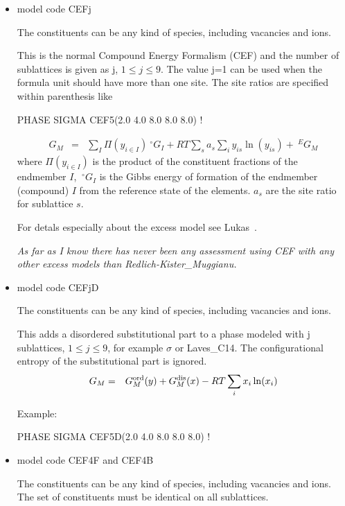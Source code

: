 \documentclass[12pt]{article}
\begin{document}
\begin{itemize}
\item model code CEFj

  The constituents can be any kind of species, including vacancies and
  ions.

  This is the normal Compound Energy Formalism (CEF) and the number of
  sublattices is given as j, $1 \leq j \leq 9$.  The value j=1 can be
  used when the formula unit should have more than one site.  The site
  ratios are specified within parenthesis like
  
  PHASE SIGMA CEF5(2.0 4.0 8.0 8.0 8.0) !
  
  \begin{eqnarray}
    G_M &=& \sum_I \Pi(y_{i\in I}) ~^{\circ}G_I + RT \sum_s a_s \sum_i y_{is}\ln(y_{is}) + ~^EG_M
  \end{eqnarray}
  where $\Pi(y_{i\in I})$ is the product of the constituent fractions
  of the endmember $I$, $~^{\circ}G_I$ is the Gibbs energy of
  formation of the endmember (compound) $I$ from the reference state
  of the elements.  $a_s$ are the site ratio for sublattice $s$.

  For detals especially about the excess model see Lukas~\cite{07Luk}.

  {\em As far as I know there has never been any assessment using CEF with
  any other excess models than Redlich-Kister\_Muggianu.}

\item model code CEFjD

  The constituents can be any kind of species, including vacancies and
  ions.

  This adds a disordered substitutional part to a phase modeled with j
  sublattices, $1\leq j \leq 9$, for example $\sigma$ or Laves\_C14.
  The configurational entropy of the substitutional part is
  ignored.
  \begin{eqnarray}
    G_M &=& G_M^{\rm ord}(y) + G_M^{\rm dis}(x) - RT\sum_i x_i\ln(x_i)
  \end{eqnarray}

  Example:

  PHASE SIGMA CEF5D(2.0 4.0 8.0 8.0 8.0) !
  
\item model code CEF4F and CEF4B 

  The constituents can be any kind of species, including vacancies and
  ions.  The set of constituents must be identical on all sublattices.


\end{itemize}
\end{document}
